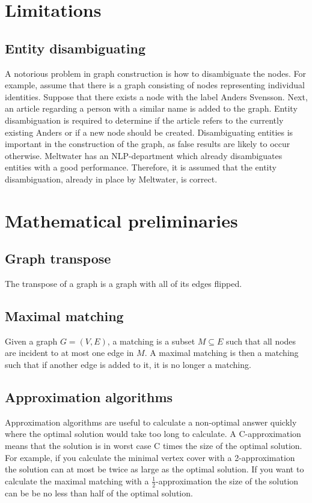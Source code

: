 \section{Limitations}
\subsection{Entity disambiguating}
A notorious problem in graph construction is how to disambiguate the nodes. For example, assume that there is a graph consisting of nodes representing individual identities. Suppose that there exists a node with the label Anders Svensson. Next, an article regarding a person with a similar name is added to the graph. Entity disambiguation is required to determine if the article refers to the currently existing Anders or if a new node should be created. Disambiguating entities is important in the construction of the graph, as false results are likely to occur otherwise. Meltwater has an NLP-department which already disambiguates entities with a good performance. Therefore, it is assumed that the entity disambiguation, already in place by Meltwater, is correct. 

\section{Mathematical preliminaries}

\subsection{Graph transpose}
The transpose of a graph is a graph with all of its edges flipped. 

\subsection{Maximal matching}
Given a graph $G = (V,E)$, a matching is a subset $M \subseteq E$ such that all nodes are incident to at most one edge in $M$. A maximal matching is then a matching such that if another edge is added to it, it is no longer a matching. 

\subsection{Approximation algorithms}
Approximation algorithms are useful to calculate a non-optimal answer quickly where the optimal solution would take too long to calculate. A C-approximation means that the solution is in worst case C times the size of the optimal solution. For example, if you calculate the minimal vertex cover with a 2-approximation the solution can at most be twice as large as the optimal solution. If you want to calculate the maximal matching with a $\frac{1}{2}$-approximation the size of the solution can be be no less than half of the optimal solution.

